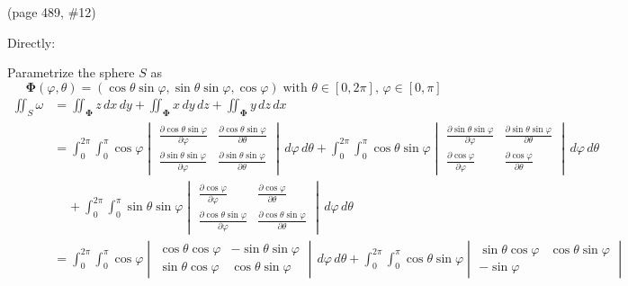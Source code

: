 \documentclass{article}
\newcommand{\partis}[2]{\frac{\partial #2}{\partial #1}}
\begin{document}
\begin{enumerate}
    (page 489, \#12)

    Directly: 
    
    Parametrize the sphere $S$ as 
    \[ \boldsymbol \Phi (\varphi, \theta) = 
    ( \cos\theta \sin\varphi , \sin\theta \sin\varphi, \cos\varphi)
    \; \text{with }\theta \in [0,2\pi],\, \varphi \in [0,\pi] \]
    \begin{align*}
        \iint_S \omega &= \iint_{\boldsymbol \Phi} z \, dx \, dy 
        + \iint_{\boldsymbol \Phi} x \, dy \, dz 
        + \iint_{\boldsymbol \Phi} y \, dz \, dx \\
        &= \int_0^{2\pi} \int_0^{\pi} 
        \cos \varphi 
        \begin{vmatrix}
        \partis{\varphi}{\cos\theta \sin \varphi} 
        & \partis{\theta}{\cos\theta \sin \varphi} 
        \\ \partis{\varphi}{\sin\theta \sin\varphi} 
        & \partis{\theta}{\sin\theta \sin\varphi} 
        \end{vmatrix} \, d\varphi \, d\theta 
        + \int_0^{2\pi} \int_0^{\pi} \cos\theta \sin\varphi 
        \begin{vmatrix} \partis{\varphi}{\sin\theta \sin\varphi} 
        & \partis{\theta}{\sin\theta \sin\varphi} 
        \\ \partis{\varphi}{\cos \varphi} 
        & \partis{\theta}{\cos \varphi} 
        \end{vmatrix}\, d\varphi \, d\theta \\
        & \; \; \; \; 
        + \int_0^{2\pi} \int_0^{\pi} \sin\theta \sin\varphi 
        \begin{vmatrix} \partis{\varphi}{\cos \varphi} 
        & \partis{\theta}{\cos \varphi} 
        \\ \partis{\varphi}{\cos\theta \sin\varphi} 
        & \partis{\theta}{\cos\theta \sin\varphi}
        \end{vmatrix}\, d\varphi \, d\theta \\
        &= \int_0^{2\pi} \int_0^{\pi} \cos \varphi 
        \begin{vmatrix}\cos \theta \cos \varphi 
        & - \sin \theta \sin \varphi  
        \\ \sin \theta \cos \varphi 
        & \cos \theta \sin \varphi 
        \end{vmatrix} \, d\varphi \, d\theta 
        + \int_0^{2\pi} \int_0^{\pi} \cos\theta \sin\varphi 
        \begin{vmatrix} \sin \theta \cos \varphi 
        & \cos \theta \sin \varphi \\ -\sin \varphi 

\end{vmatrix}
\end{align*}
\end{enumerate}
\end{document}
